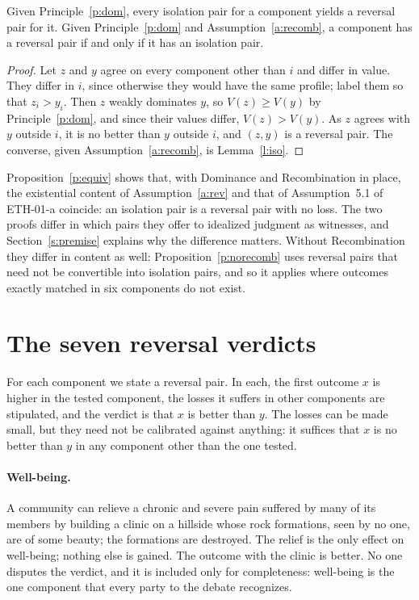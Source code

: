 \documentclass{situationist-preprint}
\begin{document}
\begin{proposition}\label{p:equiv}
Given Principle~\ref{p:dom}, every isolation pair for a component yields a reversal pair for it. Given Principle~\ref{p:dom} and Assumption~\ref{a:recomb}, a component has a reversal pair if and only if it has an isolation pair.
\end{proposition}

\begin{proof}
Let $z$ and $y$ agree on every component other than $i$ and differ in value. They differ in $i$, since otherwise they would have the same profile; label them so that $z_i > y_i$. Then $z$ weakly dominates $y$, so $V(z) \geq V(y)$ by Principle~\ref{p:dom}, and since their values differ, $V(z) > V(y)$. As $z$ agrees with $y$ outside $i$, it is no better than $y$ outside $i$, and $(z, y)$ is a reversal pair. The converse, given Assumption~\ref{a:recomb}, is Lemma~\ref{l:iso}.
\end{proof}

Proposition~\ref{p:equiv} shows that, with Dominance and Recombination in place, the existential content of Assumption~\ref{a:rev} and that of Assumption~5.1 of ETH-01-a coincide: an isolation pair is a reversal pair with no loss. The two proofs differ in which pairs they offer to idealized judgment as witnesses, and Section~\ref{s:premise} explains why the difference matters. Without Recombination they differ in content as well: Proposition~\ref{p:norecomb} uses reversal pairs that need not be convertible into isolation pairs, and so it applies where outcomes exactly matched in six components do not exist.

\section{The seven reversal verdicts}\label{s:cases}

For each component we state a reversal pair. In each, the first outcome $x$ is higher in the tested component, the losses it suffers in other components are stipulated, and the verdict is that $x$ is better than $y$. The losses can be made small, but they need not be calibrated against anything: it suffices that $x$ is no better than $y$ in any component other than the one tested.

\paragraph{Well-being.} A community can relieve a chronic and severe pain suffered by many of its members by building a clinic on a hillside whose rock formations, seen by no one, are of some beauty; the formations are destroyed. The relief is the only effect on well-being; nothing else is gained. The outcome with the clinic is better. No one disputes the verdict, and it is included only for completeness: well-being is the one component that every party to the debate recognizes.
\end{document}
